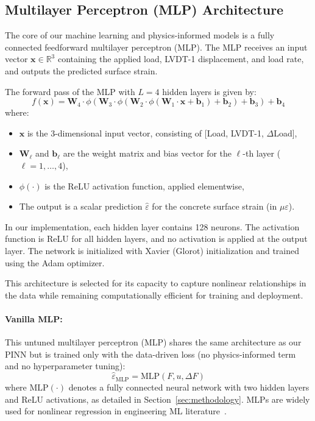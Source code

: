 \documentclass{article}
\begin{document}
\subsection{Multilayer Perceptron (MLP) Architecture}

The core of our machine learning and physics-informed models is a fully connected feedforward multilayer perceptron (MLP). The MLP receives an input vector $\mathbf{x} \in \mathbb{R}^3$ containing the applied load, LVDT-1 displacement, and load rate, and outputs the predicted surface strain.

The forward pass of the MLP with $L=4$ hidden layers is given by:
\begin{equation}
f(\mathbf{x}) = \mathbf{W}_4 \cdot \phi\left( \mathbf{W}_3 \cdot \phi\left( \mathbf{W}_2 \cdot \phi\left( \mathbf{W}_1 \cdot \mathbf{x} + \mathbf{b}_1 \right) + \mathbf{b}_2 \right) + \mathbf{b}_3 \right) + \mathbf{b}_4
\end{equation}
where:
\begin{itemize}
    \item $\mathbf{x}$ is the 3-dimensional input vector, consisting of [Load, LVDT-1, $\Delta$Load],
    \item $\mathbf{W}_\ell$ and $\mathbf{b}_\ell$ are the weight matrix and bias vector for the $\ell$-th layer ($\ell = 1,\ldots,4$),
    \item $\phi(\cdot)$ is the ReLU activation function, applied elementwise,
    \item The output is a scalar prediction $\hat{\varepsilon}$ for the concrete surface strain (in $\mu\varepsilon$).
\end{itemize}

In our implementation, each hidden layer contains 128 neurons. The activation function is ReLU for all hidden layers, and no activation is applied at the output layer. The network is initialized with Xavier (Glorot) initialization and trained using the Adam optimizer.

This architecture is selected for its capacity to capture nonlinear relationships in the data while remaining computationally efficient for training and deployment.
\paragraph{Vanilla MLP:}
This untuned multilayer perceptron (MLP) shares the same architecture as our PINN but is trained only with the data-driven loss (no physics-informed term and no hyperparameter tuning):
\begin{equation}
\hat{\varepsilon}_{\mathrm{MLP}} = \mathrm{MLP}(F, u, \Delta F)
\end{equation}
where $\mathrm{MLP}(\cdot)$ denotes a fully connected neural network with two hidden layers and ReLU activations, as detailed in Section~\ref{sec:methodology}. MLPs are widely used for nonlinear regression in engineering ML literature~\cite{goodfellow2016deep, geron2019}.
\end{document}
